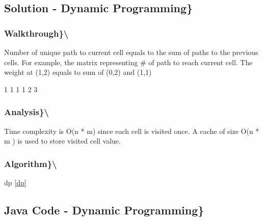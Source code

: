 \documentclass[]{book}
\newenvironment{Shaded}{\begin{snugshade}}{\end{snugshade}}
\newcommand{\DecValTok}[1]{\textcolor[rgb]{0.00,0.00,0.81}{#1}}
\begin{document}
\hypertarget{solution---dynamic-programming-1}{%
\subsection{Solution - Dynamic Programming\}}\label{solution---dynamic-programming-1}}

\hypertarget{walkthrough-47}{%
\subsubsection{Walkthrough\}\textbackslash{}}\label{walkthrough-47}}

Number of unique path to current cell equals to the sum of paths to the previous cells. For example, the matrix
representing \# of path to reach current cell. The weight at (1,2) equals to sum of (0,2) and (1,1)

\begin{Shaded}
\begin{Highlighting}[]
\DecValTok{1} \DecValTok{1} \DecValTok{1}
\DecValTok{1} \DecValTok{2} \DecValTok{3}
\end{Highlighting}
\end{Shaded}

\hypertarget{analysis-52}{%
\subsubsection{Analysis\}\textbackslash{}}\label{analysis-52}}

Time complexity is O(n * m) since each cell is visited once. A cache of size O(n * m ) is used to store visited cell
value.

\hypertarget{algorithm-52}{%
\subsubsection{Algorithm\}\textbackslash{}}\label{algorithm-52}}

dp \ref{dp}

\hypertarget{java-code---dynamic-programming-1}{%
\subsection{Java Code - Dynamic Programming\}}\label{java-code---dynamic-programming-1}}
\end{document}
